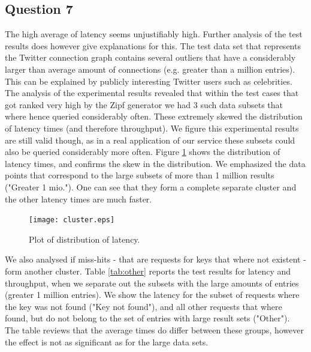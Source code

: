 \documentclass[12pt,a4paper]{article}
\begin{document}
\subsection*{Question 7}
\label{sec:pq7} 

The high average of latency seems unjustifiably high. Further analysis of the test results does however give explanations for this. The test data set that represents the Twitter connection graph contains several outliers that have a considerably larger than average amount of connections (e.g. greater than a million entries). This can be explained by publicly interesting Twitter users such as celebrities. The analysis of the experimental results revealed that within the test cases that got ranked very high by the Zipf generator we had 3 such data subsets that where hence queried considerably often. These extremely skewed the distribution of latency times (and therefore throughput). We figure this experimental results are still valid though, as in a real application of our service these subsets could also be queried considerably more often. Figure \ref{fig:cluster} shows the distribution of latency times, and confirms the skew in the distribution. We emphasized the data points that correspond to the large subsets of more than 1 million results ("Greater 1 mio."). One can see that they form a complete separate cluster and the other latency times are much faster.

\begin{figure}
\centering
  \texttt{[image: cluster.eps]}\\
  \caption{Plot of distribution of latency.}
  \label{fig:cluster}
\end{figure}

We also analysed if miss-hits - that are requests for keys that where not existent - form another cluster. Table \ref{tab:other} reports the test results for latency and throughput, when we separate out the subsets with the large amounts of entries (greater 1 million entries). We show the latency for  the subset of requests where the key was not found ("Key not found"), and all other requests that where found, but do not belong to the set of entries with large result sets ("Other"). The table reviews that the average times do differ between these groups, however the effect is not as significant as for the large data sets.
\end{document}
